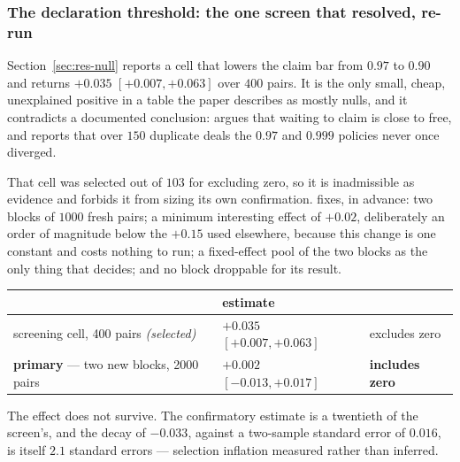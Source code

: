 \documentclass[11pt,letterpaper]{article}
\begin{document}
\subsubsection{The declaration threshold: the one screen that resolved, re-run}
\label{sec:res-claimthreshold}

Section~\ref{sec:res-null} reports a cell that lowers the claim bar from $0.97$
to $0.90$ and returns $+0.035$ $[+0.007, +0.063]$ over $400$ pairs. It is the
only small, cheap, unexplained positive in a table the paper describes as mostly
nulls, and it contradicts a documented conclusion: 
argues that waiting to claim is close to free, and reports that over $150$
duplicate deals the $0.97$ and $0.999$ policies never once diverged.

That cell was selected out of $103$ for excluding zero, so it is inadmissible as
evidence and  forbids it from sizing its
own confirmation.  fixes, in
advance: two blocks of $1000$ fresh pairs; a minimum interesting effect of
$+0.02$, deliberately an order of magnitude below the $+0.15$ used elsewhere,
because this change is one constant and costs nothing to run; a fixed-effect
pool of the two blocks as the only thing that decides; and no block droppable
for its result.

\begin{center}
\small
\begin{tabular}{lll}
\toprule
& estimate & \\
\midrule
screening cell, 400 pairs \emph{(selected)} & $+0.035$ $[+0.007, +0.063]$ & excludes zero \\
\textbf{primary} --- two new blocks, 2000 pairs & $\mathbf{+0.002}$ $[-0.013, +0.017]$ & \textbf{includes zero} \\
\bottomrule
\end{tabular}
\end{center}

The effect does not survive. The confirmatory estimate is a twentieth of the
screen's, and the decay of $-0.033$, against a two-sample standard error of
$0.016$, is itself $2.1$ standard errors --- selection inflation measured
rather than inferred.
\end{document}
